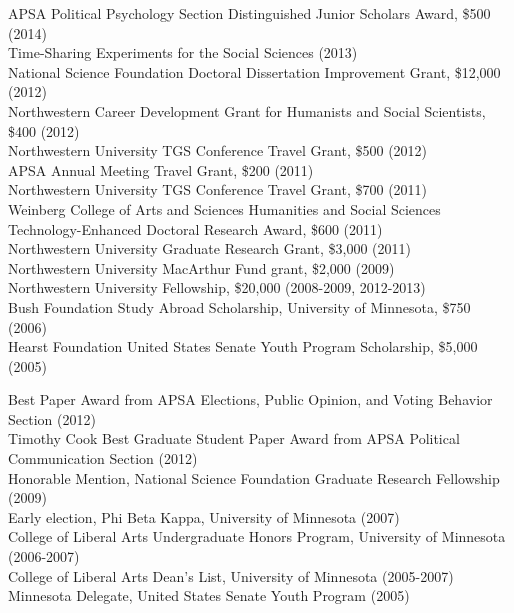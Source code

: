 \documentclass[12pt]{article}
\renewcommand{\section}[1]{\pagebreak[3]%
    \llap{\scshape\smash{\parbox[t]{\marginparwidth}{\raggedright {\color{lg}#1}}}}%
    \vspace{-\baselineskip}\par}
\newcommand{\entry}[1]{\indent {\color{lg}\guillemotright}\hspace{2pt}#1\vspace{.25em}\\}
\begin{document}
\section{Grants\\and\\Funding}
\entry{APSA Political Psychology Section Distinguished Junior Scholars Award, \$500 (2014)}
\entry{Time-Sharing Experiments for the Social Sciences (2013)}
\entry{National Science Foundation Doctoral Dissertation Improvement Grant, \$12,000 (2012)}
\entry{Northwestern Career Development Grant for Humanists and Social Scientists, \$400 (2012)}
\entry{Northwestern University TGS Conference Travel Grant, \$500 (2012)}
\entry{APSA Annual Meeting Travel Grant, \$200 (2011)}
\entry{Northwestern University TGS Conference Travel Grant, \$700 (2011)}
\entry{Weinberg College of Arts and Sciences Humanities and Social Sciences Technology-Enhanced Doctoral Research Award, \$600 (2011)}
\entry{Northwestern University Graduate Research Grant, \$3,000 (2011)}
\entry{Northwestern University MacArthur Fund grant, \$2,000 (2009)}
\entry{Northwestern University Fellowship, \$20,000 (2008-2009, 2012-2013)}
\entry{Bush Foundation Study Abroad Scholarship, University of Minnesota, \$750 (2006)}
\entry{Hearst Foundation United States Senate Youth Program Scholarship, \$5,000 (2005)}

\section{Honors\\and\\Awards}
\entry{Best Paper Award from APSA Elections, Public Opinion, and Voting Behavior Section (2012)}
\entry{Timothy Cook Best Graduate Student Paper Award from APSA Political Communication Section (2012)}
\entry{Honorable Mention, National Science Foundation Graduate Research Fellowship (2009)}
\entry{Early election, Phi Beta Kappa, University of Minnesota (2007)}
\entry{College of Liberal Arts Undergraduate Honors Program, University of Minnesota (2006-2007)}
\entry{College of Liberal Arts Dean's List, University of Minnesota (2005-2007)}
\entry{Minnesota Delegate, United States Senate Youth Program (2005)}
\end{document}
